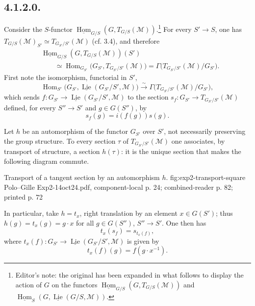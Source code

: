 \subsection*{4.1.2.0.}
Consider the \(S\)-functor
\(
  \underline{\operatorname{Hom}}_{G/S}
    (G,T_{G/S}(\mathcal M)).
\)\footnote{Editor's note: the original has been expanded in what follows
to display the action of \(G\) on the functors
\(\underline{\operatorname{Hom}}_{G/S}(G,T_{G/S}(\mathcal M))\) and
\(\underline{\operatorname{Hom}}_S
(G,\underline{\operatorname{Lie}}(G/S,\mathcal M))\).}
For every \(S'\to S\), one has
\(T_{G/S}(\mathcal M)_{S'}\simeq T_{G_{S'}/S'}(\mathcal M)\)
(cf. 3.4), and therefore
\[
\begin{aligned}
 &\underline{\operatorname{Hom}}_{G/S}
   (G,T_{G/S}(\mathcal M))(S')\\
 &\qquad\simeq
 \operatorname{Hom}_{G_{S'}}
   \bigl(G_{S'},T_{G_{S'}/S'}(\mathcal M)\bigr)
 =\Gamma\bigl(T_{G_{S'}/S'}(\mathcal M)/G_{S'}\bigr).
\end{aligned}
\]
First note the isomorphism, functorial in \(S'\),
\begin{equation}
 \operatorname{Hom}_{S'}
  \bigl(G_{S'},\underline{\operatorname{Lie}}(G_{S'}/S',\mathcal M)\bigr)
 \xrightarrow{\sim}
 \Gamma\bigl(T_{G_{S'}/S'}(\mathcal M)/G_{S'}\bigr),
 \tag{*}
\end{equation}
which sends \(f:G_{S'}\to
\underline{\operatorname{Lie}}(G_{S'}/S',\mathcal M)\) to the section
\(s_f:G_{S'}\to T_{G_{S'}/S'}(\mathcal M)\) defined, for every
\(S''\to S'\) and \(g\in G(S'')\), by
\[
  s_f(g)=i(f(g))s(g).
\]

Let \(h\) be an automorphism of the functor \(G_{S'}\) over \(S'\), not
necessarily preserving the group structure. To every section \(\tau\) of
\(T_{G_{S'}/S'}(\mathcal M)\) one associates, by transport of structure,
a section \(h(\tau)\): it is the unique section that makes the following
diagram commute.

  {Transport of a tangent section by an automorphism \(h\).}
  {fig:exp2-transport-square}
  {Polo--Gille Exp2-14oct24.pdf, component-local p. 24; combined-reader p. 82; printed p. 72}

In particular, take \(h=t_x\), right translation by an element
\(x\in G(S')\); thus \(h(g)=t_x(g)=g\cdot x\) for all
\(g\in G(S'')\), \(S''\to S'\). One then has
\[
  t_x(s_f)=s_{t_x(f)},
\]
where \(t_x(f):G_{S'}\to
\underline{\operatorname{Lie}}(G_{S'}/S',\mathcal M)\) is given by
\[
  t_x(f)(g)=f(g\cdot x^{-1}).
\]

